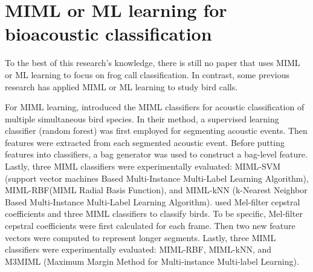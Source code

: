 \section{MIML or ML learning for bioacoustic classification}
To the best of this research's knowledge, there is still no paper that uses MIML or ML learning to focus on frog call classification. In contrast, some previous research has applied MIML or ML learning to study bird calls.

For MIML learning, \citep{briggs2012acoustic} introduced the MIML classifiers for acoustic classification of multiple simultaneous bird species. In their method, a supervised learning classifier (random forest) was first employed for segmenting acoustic events. Then features were extracted from each segmented acoustic event. Before putting features into classifiers, a bag generator was used to construct a bag-level feature. Lastly, three MIML classifiers were experimentally evaluated: MIML-SVM (support vector machines Based Multi-Instance Multi-Label Learning Algorithm), MIML-RBF(MIML Radial Basis Function), and MIML-kNN (k-Nearest Neighbor Based Multi-Instance Multi-Label Learning Algorithm).
\citep{dufour2013multi} used Mel-filter cepstral coefficients and three MIML classifiers to classify birds. To be specific, Mel-filter cepstral coefficients were first calculated for each frame. Then two new feature vectors were computed to represent longer segments.
Lastly, three MIML classifiers were experimentally evaluated: MIML-RBF, MIML-kNN, and M3MIML (Maximum Margin Method for Multi-instance Multi-label Learning). 


